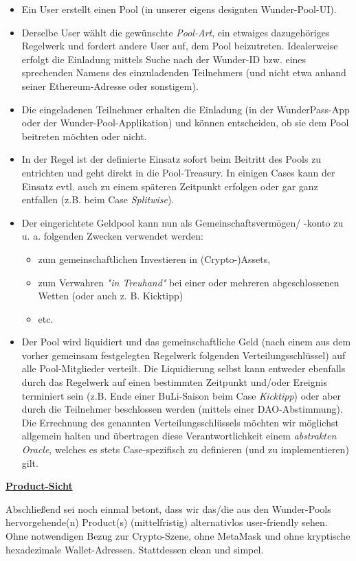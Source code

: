 \begin{itemize}
  \item Ein User erstellt einen Pool (in unserer eigens designten Wunder-Pool-UI).
  \item Derselbe User wählt die gewünschte \textit{Pool-Art}, ein etwaiges dazugehöriges Regelwerk und fordert andere User auf, dem Pool beizutreten. Idealerweise erfolgt die Einladung mittels Suche nach der Wunder-ID bzw. eines sprechenden Namens des einzuladenden Teilnehmers (und nicht etwa anhand seiner Ethereum-Adresse oder sonstigem).
  \item Die eingeladenen Teilnehmer erhalten die Einladung (in der WunderPass-App oder der Wunder-Pool-Applikation) und können entscheiden, ob sie dem Pool beitreten möchten oder nicht. 
  \item In der Regel ist der definierte Einsatz sofort beim Beitritt des Pools zu entrichten und geht direkt in die Pool-Treasury. In einigen Cases kann der Einsatz evtl. auch zu einem späteren Zeitpunkt erfolgen oder gar ganz entfallen (z.B. beim Case \textit{Splitwise}).
  \item Der eingerichtete Geldpool kann nun als Gemeinschaftsvermögen/ -konto zu u. a. folgenden Zwecken verwendet werden:
  \begin{itemize}
  	\item zum gemeinschaftlichen Investieren in (Crypto-)Assets,
  	\item zum Verwahren \textit{"in Treuhand"} bei einer oder mehreren abgeschlossenen Wetten (oder auch z. B. Kicktipp)
  	\item etc.
  \end{itemize}
  \item Der Pool wird liquidiert und das gemeinschaftliche Geld (nach einem aus dem vorher gemeinsam festgelegten Regelwerk folgenden Verteilungsschlüssel) auf alle Pool-Mitglieder verteilt. Die Liquidierung selbst kann entweder ebenfalls durch das Regelwerk auf einen bestimmten Zeitpunkt und/oder Ereignis terminiert sein (z.B. Ende einer BuLi-Saison beim Case \textit{Kicktipp}) oder aber durch die Teilnehmer beschlossen werden (mittels einer DAO-Abstimmung). Die Errechnung des genann\-ten Verteilungsschlüssels möchten wir möglichst allgemein halten und übertragen diese Verantwortlichkeit einem \textit{abstrakten Oracle}, welches es stets Case-spezifisch zu definieren (und zu implementieren) gilt.
\end{itemize}

\vspace{0.2cm}

\underline{\textbf{Product-Sicht}}

\vspace{0.2cm}

Abschließend sei noch einmal betont, dass wir das/die aus den Wunder-Pools hervorgehende(n) Product(s) (mittelfristig) alternativlos user-friendly sehen. Ohne notwendigen Bezug zur Crypto-Szene, ohne MetaMask und ohne kryptische hexadezimale Wallet-Adressen. Stattdessen clean und simpel.

\vspace{0.5cm}